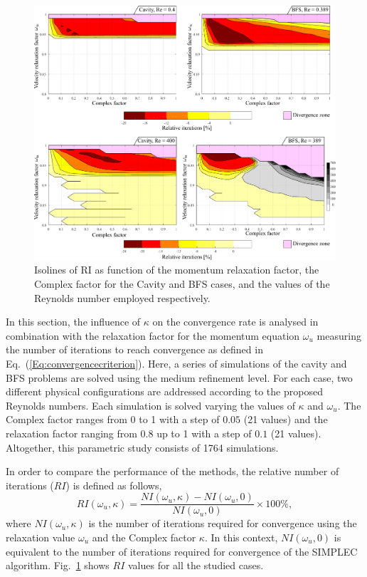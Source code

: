 \documentclass[final,3p,times,11pt,onecolumn]{myElsarticle}
\numberwithin{equation}{section}
\begin{document}
\begin{figure}[b!!]
\centering
\includegraphics[width=16cm]{fig/Results/FactorLowRe.pdf}
\caption{Isolines of RI as function of the momentum relaxation factor, the Complex factor for the Cavity and BFS cases, and the values of the Reynolds number employed respectively.}
\label{Fig:FactorLowRe}
\end{figure}

In this section, the influence of $\kappa$ on the convergence rate is analysed in combination with the relaxation factor for the momentum equation $\omega_{u}$ measuring the number of iterations to reach convergence as defined in Eq.~(\ref{Eq:convergencecriterion}). Here, a series of simulations of the cavity and BFS problems are solved using the medium refinement level. For each case, two different physical configurations are addressed according to the proposed Reynolds numbers. Each simulation is solved varying the values of $\kappa$ and $\omega_{u}$. The Complex factor ranges from 0 to 1 with a step of $0.05$ (21 values) and the relaxation factor ranging from 0.8 up to 1 with a step of $0.1$ (21 values). Altogether, this parametric study consists of 1764 simulations.

In order to compare the performance of the methods, the relative number of iterations ($RI$) is defined as follows, 
\begin{equation}
\label{Eq:relativeIndex}
RI(\omega_u, \kappa)
=
\dfrac
{
NI(\omega_u, \kappa) - NI(\omega_u, 0)
}
{
NI(\omega_u, 0)
}
\times
100 \%,
\end{equation}
where $NI(\omega_u, \kappa)$ is the number of iterations required for convergence using the relaxation value $\omega_u$ and the Complex factor $\kappa$. In this context, $NI(\omega_u, 0)$ is equivalent to the number of iterations required for convergence of the SIMPLEC algorithm. Fig.~\ref{Fig:FactorLowRe} shows $RI$ values for all the studied cases.
\end{document}
